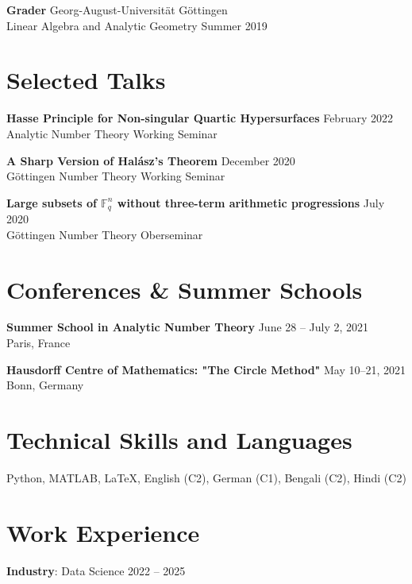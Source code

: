 \documentclass[11pt,letterpaper]{article}
\newcommand{\dateright}[1]{\hfill\textnormal{#1}}
\newcommand{\entry}[4]{%
    \textbf{#1} \dateright{#3}\\
    #2 \dateright{#4}
}
\begin{document}
\entry{Grader}{Linear Algebra and Analytic Geometry}{Georg-August-Universität Göttingen}{Summer 2019}

\section*{Selected Talks}

\textbf{Hasse Principle for Non-singular Quartic Hypersurfaces} \dateright{February 2022}\\
Analytic Number Theory Working Seminar

\vspace{0.3cm}

\textbf{A Sharp Version of Halász's Theorem} \dateright{December 2020}\\
Göttingen Number Theory Working Seminar


\vspace{0.3cm}


\textbf{Large subsets of $\mathds{F}_q^n$ without three-term arithmetic progressions} \dateright{July 2020}\\
Göttingen Number Theory Oberseminar



\section*{Conferences \& Summer Schools}

\textbf{Summer School in Analytic Number Theory} \dateright{June 28 -- July 2, 2021}\\
Paris, France

\vspace{0.1cm}

\textbf{Hausdorff Centre of Mathematics: "The Circle Method"} \dateright{May 10--21, 2021}\\
Bonn, Germany





\section*{Technical Skills and Languages}

Python, MATLAB, \LaTeX, English (C2), German (C1), Bengali (C2), Hindi (C2)


\section*{Work Experience}

\textbf{Industry}: Data Science \dateright{2022 -- 2025}
\end{document}

